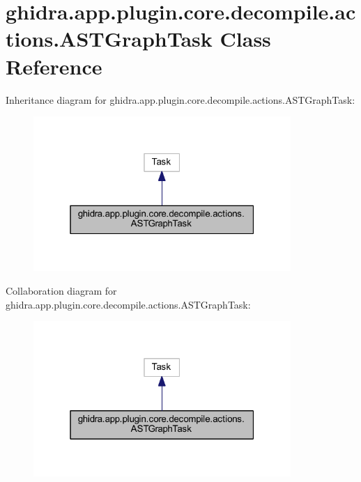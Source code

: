 \hypertarget{classghidra_1_1app_1_1plugin_1_1core_1_1decompile_1_1actions_1_1_a_s_t_graph_task}{}\section{ghidra.\+app.\+plugin.\+core.\+decompile.\+actions.\+A\+S\+T\+Graph\+Task Class Reference}
\label{classghidra_1_1app_1_1plugin_1_1core_1_1decompile_1_1actions_1_1_a_s_t_graph_task}


Inheritance diagram for ghidra.\+app.\+plugin.\+core.\+decompile.\+actions.\+A\+S\+T\+Graph\+Task\+:
\nopagebreak
\begin{figure}[H]
\begin{center}
\leavevmode
\includegraphics[width=277pt]{classghidra_1_1app_1_1plugin_1_1core_1_1decompile_1_1actions_1_1_a_s_t_graph_task__inherit__graph}
\end{center}
\end{figure}


Collaboration diagram for ghidra.\+app.\+plugin.\+core.\+decompile.\+actions.\+A\+S\+T\+Graph\+Task\+:
\nopagebreak
\begin{figure}[H]
\begin{center}
\leavevmode
\includegraphics[width=277pt]{classghidra_1_1app_1_1plugin_1_1core_1_1decompile_1_1actions_1_1_a_s_t_graph_task__coll__graph}
\end{center}
\end{figure}
